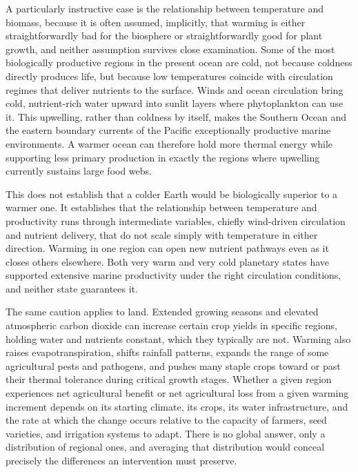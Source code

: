 \documentclass[11pt,oneside]{book}
\begin{document}
A particularly instructive case is the relationship between temperature and biomass, because it is often assumed, implicitly, that warming is either straightforwardly bad for the biosphere or straightforwardly good for plant growth, and neither assumption survives close examination. Some of the most biologically productive regions in the present ocean are cold, not because coldness directly produces life, but because low temperatures coincide with circulation regimes that deliver nutrients to the surface. Winds and ocean circulation bring cold, nutrient-rich water upward into sunlit layers where phytoplankton can use it. This upwelling, rather than coldness by itself, makes the Southern Ocean and the eastern boundary currents of the Pacific exceptionally productive marine environments. A warmer ocean can therefore hold more thermal energy while supporting less primary production in exactly the regions where upwelling currently sustains large food webs.

This does not establish that a colder Earth would be biologically superior to a warmer one. It establishes that the relationship between temperature and productivity runs through intermediate variables, chiefly wind-driven circulation and nutrient delivery, that do not scale simply with temperature in either direction. Warming in one region can open new nutrient pathways even as it closes others elsewhere. Both very warm and very cold planetary states have supported extensive marine productivity under the right circulation conditions, and neither state guarantees it.

The same caution applies to land. Extended growing seasons and elevated atmospheric carbon dioxide can increase certain crop yields in specific regions, holding water and nutrients constant, which they typically are not. Warming also raises evapotranspiration, shifts rainfall patterns, expands the range of some agricultural pests and pathogens, and pushes many staple crops toward or past their thermal tolerance during critical growth stages. Whether a given region experiences net agricultural benefit or net agricultural loss from a given warming increment depends on its starting climate, its crops, its water infrastructure, and the rate at which the change occurs relative to the capacity of farmers, seed varieties, and irrigation systems to adapt. There is no global answer, only a distribution of regional ones, and averaging that distribution would conceal precisely the differences an intervention must preserve.
\end{document}
